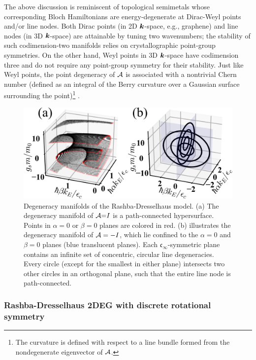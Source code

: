 \documentclass[aps, showpacs, twocolumn, notitlepage, superscriptaddress]{revtex4-1}
\begin{document}
The above discussion is reminiscent of topological semimetals whose corresponding Bloch Hamiltonians are energy-degenerate at Dirac-Weyl points\cite{wang2012dirac,wan2011topological} and/or line nodes\cite{burkov2011topological}. Both Dirac points (in 2D $\boldsymbol{k}$-space, e.g., graphene\cite{neto2009electronic}) and line nodes (in 3D $\boldsymbol{k}$-space) are attainable by tuning two wavenumbers; the stability of such codimension-two manifolds relies on crystallographic point-group symmetries. On the other hand, Weyl points in 3D $\boldsymbol{k}$-space have codimension three and do not require any point-group symmetry for their stability. Just like Weyl points, the point degeneracy of ${\cal A}$ is associated with a nontrivial Chern number\cite{TKNN} (defined as an integral of the Berry curvature\cite{berry_quantal_1984} over a Gaussian surface surrounding the point)\footnote{The curvature is defined with respect to a line bundle formed from the nondegenerate eigenvector of ${\cal A}$.} .


\begin{figure}
\includegraphics[width=1.0\columnwidth]{dgn.png}
\caption{Degeneracy manifolds of the Rashba-Dresselhaus model. (a) The degeneracy manifold of ${\cal A}{=}I$ is a path-connected hypersurface. Points in $\alpha=0$ or $\beta=0$ planes are colored in red. (b) illustrates the degeneracy manifold of ${\cal A}=-I$, which lie confined to  the $\alpha{=}0$ and $\beta{=}0$ planes (blue translucent planes). Each $\mathfrak{c}_{\infty}$-symmetric plane contains an infinite set of concentric, circular line degeneracies. Every circle (except for the smallest in either plane)  intersects two other circles in an orthogonal plane, such that the entire line node is path-connected. \label{fig:dgn}}
\end{figure}

\subsubsection{Rashba-Dresselhaus 2DEG with discrete rotational symmetry}\label{sec:disrot}
\end{document}
